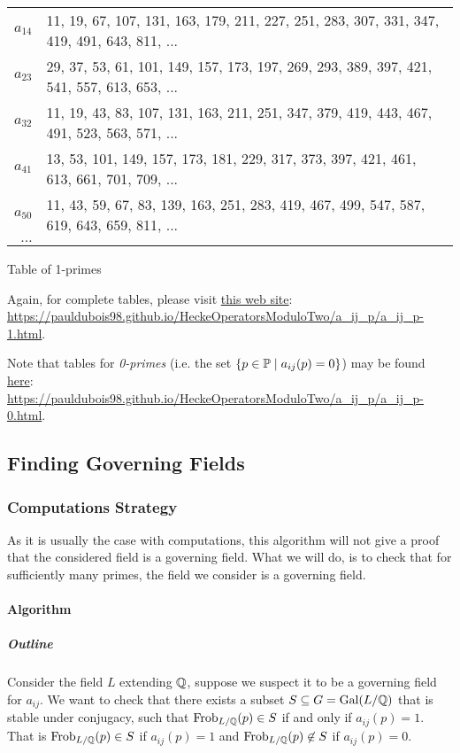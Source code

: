 \begin{center}
\begin{tabular}{|r|l|}
		$ a_{1 4} $ & 11, 19, 67, 107, 131, 163, 179, 211, 227, 251, 283, 307, 331, 347, 419, 491, 643, 811, ...\\
		$ a_{2 3} $ & 29, 37, 53, 61, 101, 149, 157, 173, 197, 269, 293, 389, 397, 421, 541, 557, 613, 653, ...\\       
		$ a_{3 2} $ & 11, 19, 43, 83, 107, 131, 163, 211, 251, 347, 379, 419, 443, 467, 491, 523, 563, 571, ...\\
		$ a_{4 1} $ & 13, 53, 101, 149, 157, 173, 181, 229, 317, 373, 397, 421, 461, 613, 661, 701, 709, ...\\
		$ a_{5 0} $ & 11, 43, 59, 67, 83, 139, 163, 251, 283, 419, 467, 499, 547, 587, 619, 643, 659, 811, ...\\
		$ \dots $ & \\
		\hline
	\end{tabular}

	Table of 1-primes
\end{center}
Again, for complete tables, please visit \href{https://pauldubois98.github.io/HeckeOperatorsModuloTwo/a_ij_p/a_ij_p-1.html}{this web site}:\\ \url{https://pauldubois98.github.io/HeckeOperatorsModuloTwo/a_ij_p/a_ij_p-1.html}.

Note that tables for \textit{0-primes} (i.e. the set $\{ p \in \mathbb{P} \mid a_{ij}(p) = 0 \}$) may be found \href{https://pauldubois98.github.io/HeckeOperatorsModuloTwo/a_ij_p/a_ij_p-0.html}{here}:\\
\url{https://pauldubois98.github.io/HeckeOperatorsModuloTwo/a_ij_p/a_ij_p-0.html}.




\subsection{Finding Governing Fields}
\label{numerics:GoverningFields}
\subsubsection{Computations Strategy}
As it is usually the case with computations, this algorithm will not give a proof that the considered field is a governing field.
What we will do, is to check that for sufficiently many primes, the field we consider is a governing field.

\paragraph{Algorithm}
\subparagraph{Outline}
Consider the field $L$ extending $\mathbb{Q}$, suppose we suspect it to be a governing field for $a_{ij}$.
We want to check that there exists a subset $S \subseteq G = \text{Gal}(L/\mathbb{Q})$ that is stable under conjugacy, such that $\text{Frob}_{L/\mathbb{Q}}(p) \in S$ if and only if $a_{ij}(p)=1$.
That is $\text{Frob}_{L/\mathbb{Q}}(p) \in S$ if $a_{ij}(p)=1$ and $\text{Frob}_{L/\mathbb{Q}}(p) \not \in S$ if $a_{ij}(p)=0$.

